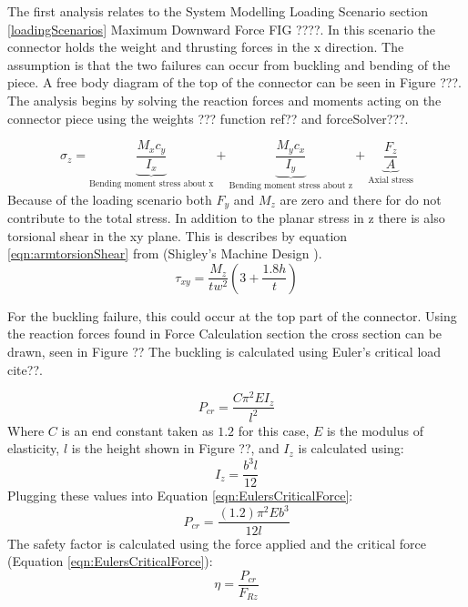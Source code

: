 \documentclass[../main.tex]{subfiles}
\begin{document}
The first analysis relates to the System Modelling Loading Scenario section \ref{loadingScenarios} Maximum Downward Force FIG ????. In this scenario the connector holds the weight and thrusting forces in the x direction. The assumption is that the two failures can occur from buckling and bending of the piece. A free body diagram of the top of the connector can be seen in Figure ???. The analysis begins by solving the reaction forces and moments acting on the connector piece using the weights ??? function ref?? and forceSolver???. 

\begin{equation}
\label{eqn:connectorztress}
\sigma_{z}=  \underbrace{\frac{M_{x}c_y}{I_x}}_\text{Bending moment stress about x} + \underbrace{\frac{M_{y}c_x}{I_y}}_\text{Bending moment stress about z} + \underbrace{\frac{F_z}{A}}_\text{Axial stress} 
\end{equation}
Because of the loading scenario both $F_y$ and $M_z$ are zero and there for do not contribute to the total stress. In addition to the planar stress in z there is also torsional shear in the xy plane. This is describes by equation \ref{eqn:armtorsionShear} from {(Shigley's Machine Design \cite[102]{shigley})}.
\begin{equation} \label{eqn:armtorsionShear}
\tau_{xy} = \dfrac{M_{z}}{tw^2}(3+\frac{1.8h}{t})
\end{equation}

For the buckling failure, this could occur at the top part of the connector. Using the reaction forces found in Force Calculation section the cross section can be drawn, seen in Figure ?? The buckling is calculated using Euler's critical load cite??. 

\begin{equation} \label{eqn:EulersCriticalForce}
P_{cr} = \frac{C\pi^2EI_z}{l^2}
\end{equation}
Where $C$ is an end constant taken as $1.2$ for this case, $E$ is the modulus of elasticity, $l$ is the height shown in Figure ??, and $I_z$ is calculated using:
\begin{equation}
I_z = \frac{b^3l}{12}
\end{equation}
Plugging these values into Equation \ref{eqn:EulersCriticalForce}:
\begin{equation}
P_{cr} = \frac{(1.2)\pi^2Eb^3}{12l}
\end{equation}
The safety factor is calculated using the force applied and the critical force (Equation \ref{eqn:EulersCriticalForce}):
\begin{equation}
\eta = \frac{P_{cr}}{F_{Rz}}
\end{equation}
\end{document}
